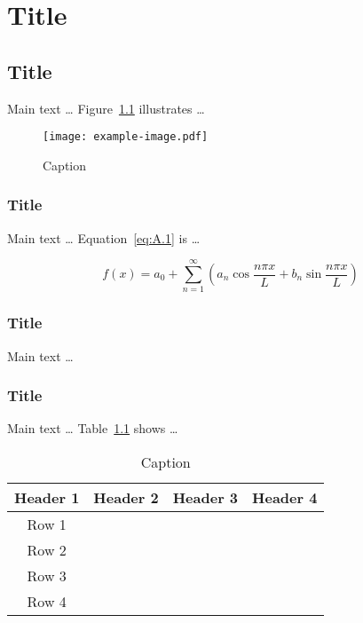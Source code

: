 \documentclass[degree=doctor,language=english]{thuthesis}
\begin{document}
\appendix

\chapter{Title}

\section{Title}

Main text … Figure~\ref{fig:A.1} illustrates …

\begin{figure}
  \centering
  \texttt{[image: example-image.pdf]}
  \caption{Caption}
  \label{fig:A.1}
\end{figure}

\subsection{Title}

Main text … Equation~\eqref{eq:A.1} is …

\begin{equation}
  f(x) = a_0 + \sum_{n=1}^\infty \left( a_n \cos⁡ \frac{n \pi x}{L}
    + b_n \sin⁡ \frac{n \pi x}{L} \right)
  \label{eq:A.1}
\end{equation}

\subsection{Title}

Main text …

\subsection{Title}

Main text … Table~\ref{tab:A.1} shows …

\begin{table}
  \centering
  \caption{Caption}
  \label{tab:A.1}
  \begin{tabular}{cccc}
    \toprule
    Header 1 & Header 2 & Header 3 & Header 4 \\
    \midrule
    Row 1 &  &  & \\
    Row 2 &  &  & \\
    Row 3 &  &  & \\
    Row 4 &  &  & \\
    \bottomrule
  \end{tabular}
\end{table}
\end{document}
